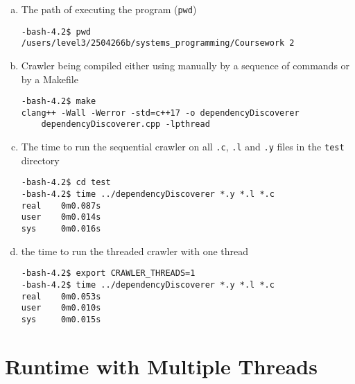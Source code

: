 \documentclass{article}
\newcommand{\code}[1]{\texttt{#1}}
\begin{document}
\begin{enumerate}[a)]

    \item The path of executing the program (\code{pwd})
\begin{verbatim}
-bash-4.2$ pwd
/users/level3/2504266b/systems_programming/Coursework 2
\end{verbatim}

\vspace{0.5cm}

    \item Crawler being compiled either using manually by a sequence of commands or by a Makefile
        \begin{verbatim}
-bash-4.2$ make
clang++ -Wall -Werror -std=c++17 -o dependencyDiscoverer
    dependencyDiscoverer.cpp -lpthread
        \end{verbatim}

\vspace{0.5cm}

    \item The time to run the sequential crawler on all \code{.c}, \code{.l} and \code{.y} files in the \code{test} directory
        \begin{verbatim}
-bash-4.2$ cd test
-bash-4.2$ time ../dependencyDiscoverer *.y *.l *.c
real    0m0.087s
user    0m0.014s
sys     0m0.016s
        \end{verbatim}

\vspace{0.5cm}

    \item the time to run the threaded crawler with one thread
        \begin{verbatim}
-bash-4.2$ export CRAWLER_THREADS=1
-bash-4.2$ time ../dependencyDiscoverer *.y *.l *.c
real    0m0.053s
user    0m0.010s
sys     0m0.015s
        \end{verbatim}

\end{enumerate}

\vspace{0.5cm}


\newpage

\section{Runtime with Multiple Threads}
\end{document}
